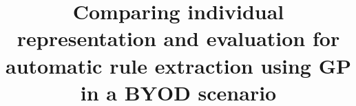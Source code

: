 %
%
%
%
%
%
\RequirePackage{fix-cm}
%
\documentclass[smalcondensed,natbib]{svjour3}
%
\smartqed  %
%
\usepackage[latin1]{inputenc}
\usepackage{amssymb}
\usepackage{graphicx}
\usepackage{amsmath}
\usepackage{url}
\usepackage{multirow}
%
%
%
%
%


\title{Comparing individual representation and evaluation for automatic rule extraction using GP in a BYOD scenario%
}



